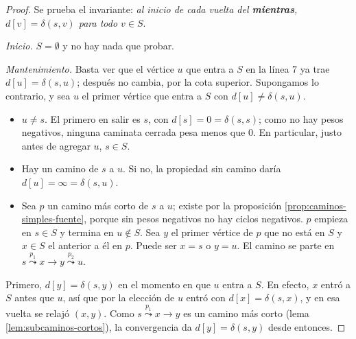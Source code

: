 \documentclass[11pt,letterpaper]{article}
\begin{document}
\begin{proof}
  Se prueba el invariante: \emph{al inicio de cada vuelta del
  \textbf{mientras}, $d[v] = \delta(s, v)$ para todo $v \in S$}.

  \textit{Inicio.} $S = \emptyset$ y no hay nada que probar.

  \textit{Mantenimiento.} Basta ver que el vértice $u$ que entra a $S$
  en la línea 7 ya trae $d[u] = \delta(s, u)$; después no cambia, por
  la cota superior. Supongamos lo contrario, y sea $u$ el primer
  vértice que entra a $S$ con $d[u] \neq \delta(s, u)$.
  \begin{itemize}[itemsep=0.1em]
    \item $u \neq s$. El primero en salir es $s$, con
          $d[s] = 0 = \delta(s, s)$; como no hay pesos negativos,
          ninguna caminata cerrada pesa menos que $0$. En particular,
          justo antes de agregar $u$, $s \in S$.
    \item Hay un camino de $s$ a $u$. Si no, la propiedad sin camino
          daría $d[u] = \infty = \delta(s, u)$.
    \item Sea $p$ un camino más corto de $s$ a $u$; existe por la
          proposición \ref{prop:caminos-simples-fuente}, porque sin
          pesos negativos no hay ciclos negativos. $p$ empieza en
          $s \in S$ y termina en $u \notin S$. Sea $y$ el primer
          vértice de $p$ que no está en $S$ y $x \in S$ el anterior a
          él en $p$. Puede ser $x = s$ o $y = u$. El camino se parte
          en $s \overset{p_1}{\leadsto} x \to y
          \overset{p_2}{\leadsto} u$.
  \end{itemize}
  \begin{center}
  \end{center}
  Primero, $d[y] = \delta(s, y)$ en el momento en que $u$ entra a
  $S$. En efecto, $x$ entró a $S$ antes que $u$, así que por la
  elección de $u$ entró con $d[x] = \delta(s, x)$, y en esa vuelta se
  relajó $(x, y)$. Como $s \overset{p_1}{\leadsto} x \to y$ es un
  camino más corto (lema \ref{lem:subcaminos-cortos}), la convergencia
  da $d[y] = \delta(s, y)$ desde entonces.


\end{proof}
\end{document}
